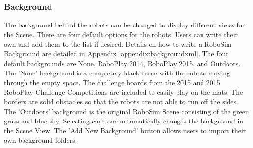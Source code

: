 \documentclass{article}
\begin{document}
\subsubsection{Background}
The background behind the robots can be changed to display different views for
the Scene.  There are four default options for the robots.  Users can write
their own and add them to the list if desired.  Details on how to write a
RoboSim Background are detailed in Appendix \ref{appendix:backgroundxml}.  The
four default backgrounds are None, RoboPlay 2014, RoboPlay 2015, and Outdoors.
The 'None' background is a completely black scene with the robots moving through
the empty space.  The challenge boards from the 2015 and 2015 RoboPlay Challenge
Competitions are included to easily play on the mats.  The borders are solid
obstacles so that the robots are not able to run off the sides.  The 'Outdoors'
background is the original RoboSim Scene consisting of the green grass and blue
sky.  Selecting each one automatically changes the background in the Scene View.
The 'Add New Background' button allows users to import their own background
folders.
\end{document}
